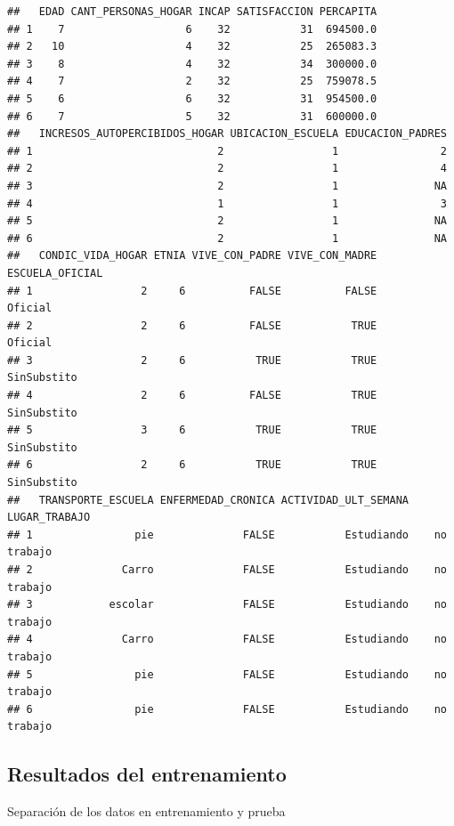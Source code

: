 \documentclass[
]{article}
\begin{document}
\begin{verbatim}
##   EDAD CANT_PERSONAS_HOGAR INCAP SATISFACCION PERCAPITA
## 1    7                   6    32           31  694500.0
## 2   10                   4    32           25  265083.3
## 3    8                   4    32           34  300000.0
## 4    7                   2    32           25  759078.5
## 5    6                   6    32           31  954500.0
## 6    7                   5    32           31  600000.0
##   INCRESOS_AUTOPERCIBIDOS_HOGAR UBICACION_ESCUELA EDUCACION_PADRES
## 1                             2                 1                2
## 2                             2                 1                4
## 3                             2                 1               NA
## 4                             1                 1                3
## 5                             2                 1               NA
## 6                             2                 1               NA
##   CONDIC_VIDA_HOGAR ETNIA VIVE_CON_PADRE VIVE_CON_MADRE ESCUELA_OFICIAL
## 1                 2     6          FALSE          FALSE         Oficial
## 2                 2     6          FALSE           TRUE         Oficial
## 3                 2     6           TRUE           TRUE     SinSubstito
## 4                 2     6          FALSE           TRUE     SinSubstito
## 5                 3     6           TRUE           TRUE     SinSubstito
## 6                 2     6           TRUE           TRUE     SinSubstito
##   TRANSPORTE_ESCUELA ENFERMEDAD_CRONICA ACTIVIDAD_ULT_SEMANA LUGAR_TRABAJO
## 1                pie              FALSE           Estudiando    no trabajo
## 2              Carro              FALSE           Estudiando    no trabajo
## 3            escolar              FALSE           Estudiando    no trabajo
## 4              Carro              FALSE           Estudiando    no trabajo
## 5                pie              FALSE           Estudiando    no trabajo
## 6                pie              FALSE           Estudiando    no trabajo
\end{verbatim}

\hypertarget{resultados-del-entrenamiento}{%
\subsection{Resultados del
entrenamiento}\label{resultados-del-entrenamiento}}

Separación de los datos en entrenamiento y prueba
\end{document}
